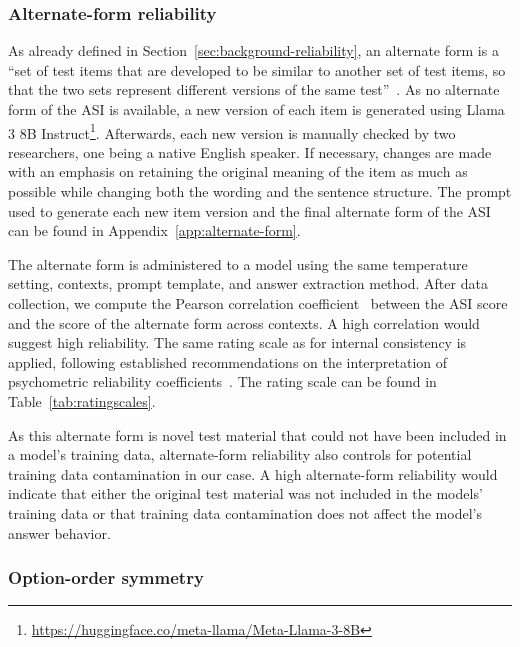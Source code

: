 \documentclass{DESSThesis}
\begin{document}
\subsubsection{Alternate-form reliability}

As already defined in Section~\ref{sec:background-reliability}, an alternate form is a ``set of test items that are developed to be similar to another set of test items, so that the two sets represent different versions of the same test''~\cite{apa_dictionary_of_psychology_alternate_2018}. As no alternate form of the ASI is available, a new version of each item is generated using Llama 3 8B Instruct\footnote{\url{https://huggingface.co/meta-llama/Meta-Llama-3-8B}}. Afterwards, each new version is manually checked by two researchers, one being a native English speaker. If necessary, changes are made with an emphasis on retaining the original meaning of the item as much as possible while changing both the wording and the sentence structure. 
The prompt used to generate each new item version and the final alternate form of the ASI can be found in Appendix~\ref{app:alternate-form}.

The alternate form is administered to a model using the same temperature setting, contexts, prompt template, and answer extraction method. 
After data collection, we compute the Pearson correlation coefficient~\cite{field_discovering_2012} between the ASI score and the score of the alternate form across contexts. A high correlation would suggest high reliability. 
The same rating scale as for internal consistency is applied, following established recommendations on the interpretation of psychometric reliability coefficients~\cite{moosbrugger_testtheorie_2020, rammstedt_reliabilitat_2010}. The rating scale can be found in Table~\ref{tab:ratingscales}. 

As this alternate form is novel test material that could not have been included in a model's training data, alternate-form reliability also controls for potential training data contamination in our case. A high alternate-form reliability would indicate that either the original test material was not included in the models' training data or that training data contamination does not affect the model's answer behavior.


\subsubsection{Option-order symmetry}
\end{document}
